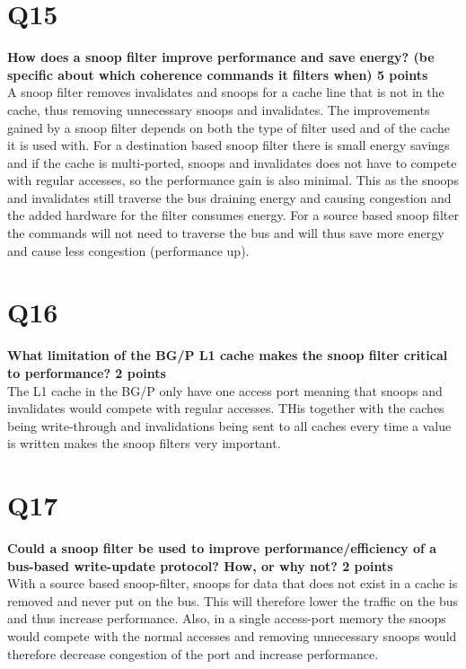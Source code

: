 \documentclass[a4paper]{article}
\begin{document}
\section*{Q15}
\large{\textbf{
How does a snoop filter improve performance and save energy? (be specific about which coherence commands it filters when) 5 points\\}}
A snoop filter removes invalidates and snoops for a cache line that is not in the cache, thus removing unnecessary snoops and invalidates. The improvements gained by a snoop filter depends on both the type of filter used and of the cache it is used with. For a destination based snoop filter there is small energy savings and if the cache is multi-ported, snoops and invalidates does not have to compete with regular accesses, so the performance gain is also minimal. This as the snoops and invalidates still traverse the bus draining energy and causing congestion and the added hardware for the filter consumes energy. For a source based snoop filter the commands will not need to traverse the bus and will thus save more energy and cause less congestion (performance up).

\section*{Q16}
\large{\textbf{
What limitation of the BG/P L1 cache makes the snoop filter critical to performance? 2 points\\}}
The L1 cache in the BG/P only have one access port meaning that snoops and invalidates would compete with regular accesses. THis together with the caches being write-through and invalidations being sent to all caches every time a value is written makes the snoop filters very important.

\section*{Q17}
\large{\textbf{
Could a snoop filter be used to improve performance/efficiency of a bus-based write-update protocol? How, or why not? 2 points\\}}
With a source based snoop-filter, snoops for data that does not exist in a cache is removed and never put on the bus. This will therefore lower the traffic on the bus and thus increase performance. Also, in a single access-port memory the snoops would compete with the normal accesses and removing unnecessary snoops would therefore decrease congestion of the port and increase performance.
\end{document}
